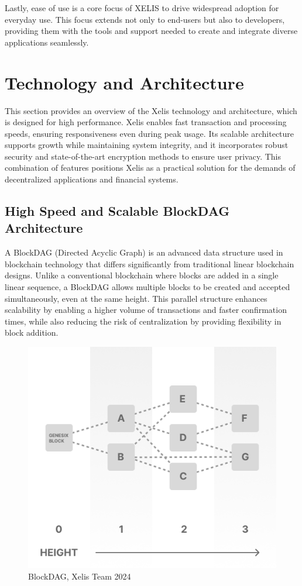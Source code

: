\documentclass[10pt,a4paper,twocolumn]{article}
\begin{document}
Lastly, ease of use is a core focus of XELIS to drive widespread adoption for everyday use. This focus extends not only to end-users but also to developers, providing them with the tools and support needed to create and integrate diverse applications seamlessly.\\

\section{Technology and Architecture}

This section provides an overview of the Xelis technology and architecture, which is designed for high performance. Xelis enables fast transaction and processing speeds, ensuring responsiveness even during peak usage. Its scalable architecture supports growth while maintaining system integrity, and it incorporates robust security and state-of-the-art encryption methods to ensure user privacy. This combination of features positions Xelis as a practical solution for the demands of decentralized applications and financial systems.\\

\subsection{High Speed and Scalable BlockDAG Architecture}

A BlockDAG (Directed Acyclic Graph) is an advanced data structure used in blockchain technology that differs significantly from traditional linear blockchain designs. Unlike a conventional blockchain where blocks are added in a single linear sequence, a BlockDAG allows multiple blocks to be created and accepted simultaneously, even at the same height. This parallel structure enhances scalability by enabling a higher volume of transactions and faster confirmation times, while also reducing the risk of centralization by providing flexibility in block addition.\\

\begin{figure}
    \centering
    \includegraphics[width=0.8\linewidth]{Frame 1 (7).png}
    \caption{BlockDAG, Xelis Team 2024}
\end{figure}
\end{document}
